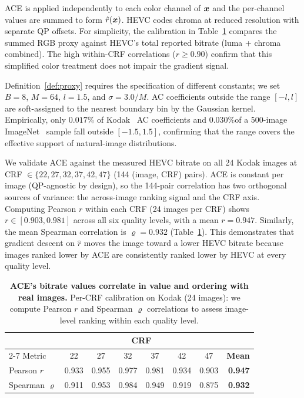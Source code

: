 ACE is applied independently to each color channel of $\boldsymbol{x}$ and the per-channel values are summed to form $\hat{r}(\boldsymbol{x})$.
HEVC codes chroma at reduced resolution with separate QP offsets.
For simplicity, the calibration in Table~\ref{tab:calibration} compares the summed RGB proxy against HEVC's total reported bitrate (luma + chroma combined).
The high within-CRF correlations ($r\ge0.90$) confirm that this simplified color treatment does not impair the gradient signal.

Definition~\ref{def:proxy} requires the specification of different constants; we set $B=8$, $M=64$, $l=1.5$, and $\sigma=3.0/M$.
AC coefficients outside the range $[-l,l]$ are soft-assigned to the nearest boundary bin by the Gaussian kernel.
Empirically, only $0.017\%$ of Kodak~\citep{kodak1993} AC coefficients and $0.030\%$of a 500-image ImageNet~\citep{deng2009imagenet} sample fall outside $[-1.5, 1.5]$, confirming that the range covers the effective support of natural-image distributions.

We validate ACE against the measured HEVC bitrate on all 24 Kodak images at CRF $\in\{22,27,32,37,42,47\}$ (144 (image, CRF) pairs).
ACE is constant per image (QP-agnostic by design), so the 144-pair correlation has two orthogonal sources of variance: the across-image ranking signal and the CRF axis.
Computing Pearson $r$ within each CRF (24 images per CRF) shows $r \in [0.903, 0.981]$ across all six quality levels, with a mean $r = 0.947$.
Similarly, the mean Spearman correlation is $\varrho = 0.932$ (Table~\ref{tab:calibration}).
This demonstrates that gradient descent on $\hat{r}$ moves the image toward a lower HEVC bitrate because images ranked lower by ACE are consistently ranked lower by HEVC at every quality level.

\begin{table}[ht]
  \centering
  \small
  \caption{
  \textbf{ACE's bitrate values correlate in value and ordering with real images.}
  Per-CRF calibration on Kodak (24 images): we compute Pearson $r$ and Spearman $\varrho$ correlations to assess image-level ranking within each quality level.}
  \label{tab:calibration}
  \begin{tabular}{lccccccr}
    \toprule
     & \multicolumn{6}{c}{CRF} & \\
    \cmidrule(lr){2-7}
    Metric & 22 & 27 & 32 & 37 & 42 & 47 & \textbf{Mean} \\
    \midrule
    Pearson $r$      & 0.933 & 0.955 & 0.977 & 0.981 & 0.934 & 0.903 & \textbf{0.947} \\
    Spearman $\varrho$ & 0.911 & 0.953 & 0.984 & 0.949 & 0.919 & 0.875 & \textbf{0.932} \\
    \bottomrule
  \end{tabular}
\end{table}

